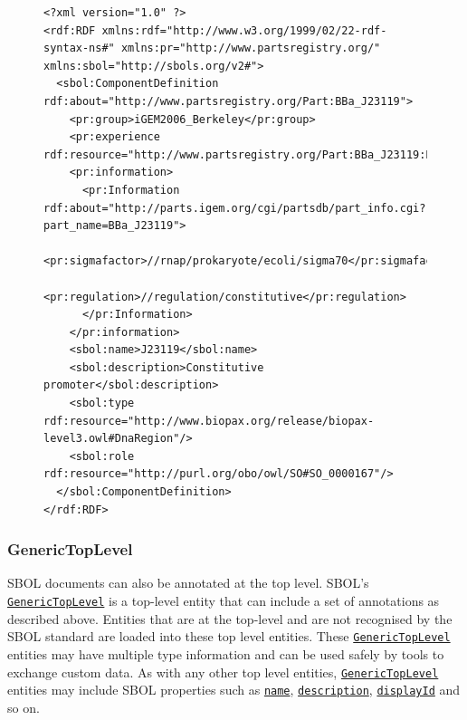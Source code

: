 \documentclass[draftspec]{sbmlpkgspec}
\newcommand{\lstsetsbol}{
 \lstset{language=sbol,
        tabsize=2
 }
}
\newcommand{\sbol}[1]{\texttt{\hyperref[sec:#1]{#1}}}
\begin{document}
\begin{figure} [ht]
\lstsetsbol
\begin{lstlisting}
<?xml version="1.0" ?>
<rdf:RDF xmlns:rdf="http://www.w3.org/1999/02/22-rdf-syntax-ns#" xmlns:pr="http://www.partsregistry.org/" xmlns:sbol="http://sbols.org/v2#">
  <sbol:ComponentDefinition rdf:about="http://www.partsregistry.org/Part:BBa_J23119">
    <pr:group>iGEM2006_Berkeley</pr:group>
    <pr:experience rdf:resource="http://www.partsregistry.org/Part:BBa_J23119:Experience"/>
    <pr:information>
      <pr:Information rdf:about="http://parts.igem.org/cgi/partsdb/part_info.cgi?part_name=BBa_J23119">
        <pr:sigmafactor>//rnap/prokaryote/ecoli/sigma70</pr:sigmafactor>
        <pr:regulation>//regulation/constitutive</pr:regulation>
      </pr:Information>
    </pr:information>
    <sbol:name>J23119</sbol:name>
    <sbol:description>Constitutive promoter</sbol:description>
    <sbol:type rdf:resource="http://www.biopax.org/release/biopax-level3.owl#DnaRegion"/>
    <sbol:role rdf:resource="http://purl.org/obo/owl/SO#SO_0000167"/>
  </sbol:ComponentDefinition>
</rdf:RDF>
\end{lstlisting}
\label{ser:Annotation}
\end{figure}




\subsubsection{GenericTopLevel}  
\label{sec:GenericTopLevel}
SBOL documents can also be annotated at the top level. SBOL's \sbol{GenericTopLevel} is a top-level entity that can include a set of annotations as described above. Entities that are at the top-level and are not recognised by the SBOL standard are loaded into these top level entities. These \sbol{GenericTopLevel} entities may have multiple type information and can be used safely by tools to exchange custom data. As with any other top level entities, \sbol{GenericTopLevel} entities may include SBOL properties such as \sbol{name}, \sbol{description}, \sbol{displayId} and so on.
\end{document}
